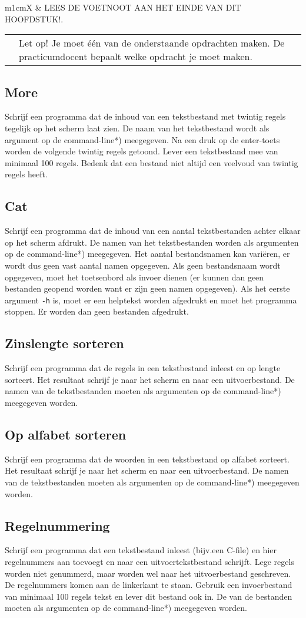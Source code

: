 \documentclass[a4paper,10pt,fleqn,twoside]{article}
\newcommand{\letop}{%
\vspace*{2ex}
\begin{mdframed}[outerlinewidth = 1 ,%
roundcorner = 4 pt,%
leftmargin = 40,%
rightmargin = 40,%
backgroundcolor = yellow!40,%
outerlinecolor = red!70!black,%
innertopmargin = \topskip,%
splittopskip = \topskip,%
]
\begin{tabularx}{\linewidth}{m{1cm}X}
\Large\leftpointright & Let op! Je moet één van de onderstaande opdrachten maken. De practicumdocent bepaalt welke opdracht je moet maken.
\end{tabularx}
\end{mdframed}
}
\newcommand{\leesvoetnoot}{%
\vspace*{2ex}
\begin{mdframed}[outerlinewidth = 1 ,%
roundcorner = 4 pt,%
leftmargin = 40,%
rightmargin = 40,%
backgroundcolor = yellow!40,%
outerlinecolor = red!70!black,%
innertopmargin = \topskip,%
splittopskip = \topskip,%
]
\begin{tabularx}{\linewidth}{m{1cm}X}
\Large\leftpointright & LEES DE VOETNOOT AAN HET EINDE VAN DIT HOOFDSTUK!.
\end{tabularx}
\end{mdframed}
}
\begin{document}
\leesvoetnoot

\letop

\subsection{More}
Schrijf een programma dat de inhoud van een tekstbestand met twintig regels tegelijk op het scherm laat zien. De naam van het tekstbestand wordt als argument op de command-line*) meegegeven. Na een druk op de enter-toets worden de volgende twintig regels getoond. Lever een tekstbestand mee van minimaal 100 regels. Bedenk dat een bestand niet altijd een veelvoud van twintig regels heeft.

\subsection{Cat}
Schrijf een programma dat de inhoud van een aantal tekstbestanden achter elkaar op het scherm afdrukt. De namen van het tekstbestanden worden als argumenten op de command-line*) meegegeven. Het aantal bestandsnamen kan variëren, er wordt dus geen vast aantal namen opgegeven. Als geen bestandsnaam wordt opgegeven, moet het toetsenbord als invoer dienen (er kunnen dan geen bestanden geopend worden want er zijn geen namen opgegeven). Als het eerste argument \lstinline|-h| is, moet
er een helptekst worden afgedrukt en moet het programma stoppen. Er worden dan geen bestanden afgedrukt.

\subsection{Zinslengte sorteren}
Schrijf een programma dat de regels in een tekstbestand inleest en op lengte sorteert. Het resultaat schrijf je naar het scherm en naar een uitvoerbestand. De namen van de tekstbestanden moeten als argumenten op de command-line*) meegegeven worden.

\subsection{Op alfabet sorteren}
Schrijf een programma dat de woorden in een tekstbestand op alfabet sorteert. Het resultaat schrijf je naar het scherm en naar een uitvoerbestand. De namen van de tekstbestanden moeten als argumenten op de command-line*) meegegeven worden.

\subsection{Regelnummering}
Schrijf een programma dat een tekstbestand inleest (bijv.\@ een C-file) en hier regelnummers aan toevoegt en naar een uitvoertekstbestand schrijft. Lege regels worden niet genummerd, maar worden wel naar het uitvoerbestand geschreven. De regelnummers komen aan de linkerkant te staan. Gebruik een invoerbestand van minimaal 100 regels tekst en lever dit bestand ook in. De van de bestanden moeten als argumenten op de command-line*) meegegeven worden.
\end{document}
